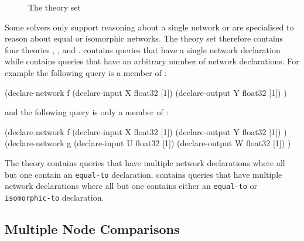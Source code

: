 \begin{figure}[h]
\centering
{}
\caption{The \multiNetwork{} theory set}
\label{fig:multiple-networks-theory-set}
\end{figure}

Some solvers only support reasoning about a single network or are specialised to reason about equal or isomorphic networks. The \multiNetwork{} theory set therefore contains four theories \snet{}, \menet{}, \minet{} and \mnet{}. \snet{} contains queries that have a single network declaration while \mnet{} contains queries that have an arbitrary number of network declarations. For example the following query is a member of \snet{}:

\begin{code}[style=lbnf]
(declare-network f
    (declare-input  X float32 [1])
    (declare-output Y float32 [1])
)
\end{code}

and the following query is only a member of \mnet{}:

\begin{code}[style=lbnf]
(declare-network f
    (declare-input  X float32 [1])
    (declare-output Y float32 [1])
)
(declare-network g
    (declare-input  U float32 [1])
    (declare-output W float32 [1])
)
\end{code}

The theory \menet{} contains queries that have multiple network declarations where all but one contain an \texttt{equal-to} declaration.
\minet{} contains queries that have multiple network declarations where all but one contains either an \texttt{equal-to} or \texttt{isomorphic-to} declaration.


\subsection{Multiple Node Comparisons}
\label{sec:multi-node-comparisons}

